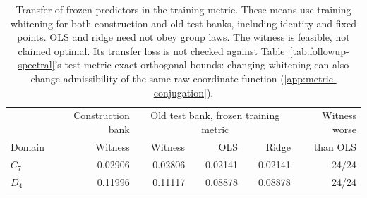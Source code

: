 \begin{table}[t]
\centering\small
\begin{tabular}{@{}lrrrrr@{}}
\toprule
& Construction bank & \multicolumn{3}{c}{Old test bank, frozen training metric} & Witness worse \\
Domain & Witness & Witness & OLS & Ridge & than OLS \\
\midrule
$C_7$ & 0.02906 & 0.02806 & 0.02141 & 0.02141 & 24/24 \\
$D_4$ & 0.11996 & 0.11117 & 0.08878 & 0.08878 & 24/24 \\
\bottomrule
\end{tabular}
\caption{Transfer of frozen predictors in the training metric. These means use training whitening for both construction and old test banks, including identity and fixed points. OLS and ridge need not obey group laws. The witness is feasible, not claimed optimal. Its transfer loss is not checked against Table~\ref{tab:followup-spectral}'s test-metric exact-orthogonal bounds: changing whitening can also change admissibility of the same raw-coordinate function (\cref{app:metric-conjugation}).}
\label{tab:followup-witness}
\end{table}
